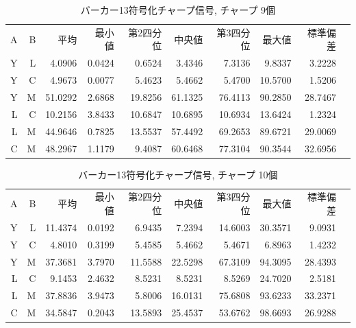 \begin{table}[p]\centering
  \caption{バーカー13符号化チャープ信号, チャープ 9個}
  \label{tab:hikaku9}
  \begin{tabular}{rrrrrrrrrr}
    \hline
     A & B & 平均 & 最小値 & 第2四分位 & 中央値 & 第3四分位 & 最大値 & 標準偏差 \\
     Y & L & 4.0906 & 0.0424 & 0.6524 & 3.4346 & 7.3136 & 9.8337 & 3.2228 \\
     Y & C & 4.9673 & 0.0077 & 5.4623 & 5.4662 & 5.4700 & 10.5700 & 1.5206 \\
     Y & M & 51.0292 & 2.6868 & 19.8256 & 61.1325 & 76.4113 & 90.2850 & 28.7467 \\
     L & C & 10.2156 & 3.8433 & 10.6847 & 10.6895 & 10.6934 & 13.6424 & 1.2324 \\
     L & M & 44.9646 & 0.7825 & 13.5537 & 57.4492 & 69.2653 & 89.6721 & 29.0069 \\
     C & M & 48.2967 & 1.1179 & 9.4087 & 60.6468 & 77.3104 & 90.3544 & 32.6956 \\
    \hline
  \end{tabular}
\end{table}

\begin{table}[p]\centering
  \caption{バーカー13符号化チャープ信号, チャープ 10個}
  \label{tab:hikaku10}
  \begin{tabular}{rrrrrrrrrr}
    \hline
     A & B & 平均 & 最小値 & 第2四分位 & 中央値 & 第3四分位 & 最大値 & 標準偏差 \\
     Y & L & 11.4374 & 0.0192 & 6.9435 & 7.2394 & 14.6003 & 30.3571 & 9.0931 \\
     Y & C & 4.8010 & 0.3199 & 5.4585 & 5.4662 & 5.4671 & 6.8963 & 1.4232 \\
     Y & M & 37.3681 & 3.7970 & 11.5588 & 22.5298 & 67.3109 & 94.3095 & 28.4393 \\
     L & C & 9.1453 & 2.4632 & 8.5231 & 8.5231 & 8.5269 & 24.7020 & 2.5181 \\
     L & M & 37.8836 & 3.9473 & 5.8006 & 16.0131 & 75.6808 & 93.6233 & 33.2371 \\
     C & M & 34.5847 & 0.2043 & 13.5893 & 25.4537 & 53.6762 & 98.6693 & 26.9288 \\
    \hline
  \end{tabular}
\end{table}


